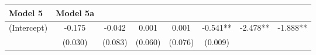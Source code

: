 \documentclass[]{article}
\begin{document}
\begin{longtable}[]{@{}lccccccc@{}}
\begin{minipage}[b]{0.10\columnwidth}
Model 5\strut
\end{minipage} & \begin{minipage}[b]{0.10\columnwidth}\centering\strut
Model 5a\strut
\end{minipage}\tabularnewline
\midrule
\endhead
\begin{minipage}[t]{0.12\columnwidth}\raggedright\strut
(Intercept)\strut
\end{minipage} & \begin{minipage}[t]{0.09\columnwidth}\centering\strut
-0.175\strut
\end{minipage} & \begin{minipage}[t]{0.10\columnwidth}\centering\strut
-0.042\strut
\end{minipage} & \begin{minipage}[t]{0.10\columnwidth}\centering\strut
0.001\strut
\end{minipage} & \begin{minipage}[t]{0.10\columnwidth}\centering\strut
0.001\strut
\end{minipage} & \begin{minipage}[t]{0.10\columnwidth}\centering\strut
-0.541**\strut
\end{minipage} & \begin{minipage}[t]{0.10\columnwidth}\centering\strut
-2.478**\strut
\end{minipage} & \begin{minipage}[t]{0.10\columnwidth}\centering\strut
-1.888**\strut
\end{minipage}\tabularnewline
\begin{minipage}[t]{0.12\columnwidth}\raggedright\strut
\strut
\end{minipage} & \begin{minipage}[t]{0.09\columnwidth}\centering\strut
(0.030)\strut
\end{minipage} & \begin{minipage}[t]{0.10\columnwidth}\centering\strut
(0.083)\strut
\end{minipage} & \begin{minipage}[t]{0.10\columnwidth}\centering\strut
(0.060)\strut
\end{minipage} & \begin{minipage}[t]{0.10\columnwidth}\centering\strut
(0.076)\strut
\end{minipage} & \begin{minipage}[t]{0.10\columnwidth}\centering\strut
(0.009)\strut
\end{minipage} & \begin{minipage}[t]{0.10\columnwidth}\centering\strut

\end{minipage}
\end{longtable}
\end{document}
